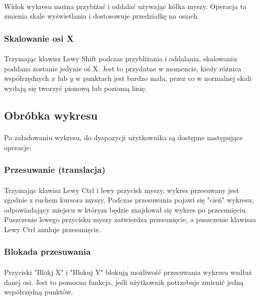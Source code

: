 \documentclass[12pt]{report}
\begin{document}
	\paragraph{}
	Widok wykresu można przybiżać i oddalać używając kółka myszy. Operacja ta zmienia skale wyświetlania i dostosowuje przedziałkę na osiach.
	
	\subsubsection{Skalowanie osi X}
	\paragraph{}
	Trzymając klawisz Lewy Shift podczas przybliżania i oddalania, skalowaniu poddana zostanie jedynie oś X. Jest to przydatne w momencie, kiedy różnica współrzędnych $x$ lub $y$ w punktach jest bardzo mała, przez co w normalnej skali wydają się tworzyć pionową lub poziomą linię.
	
	\subsection{Obróbka wykresu}
	\paragraph{}
	Po załadowaniu wykresu, do dyspozycji użytkownika są dostępne następujące operacje:
	
	\subsubsection{Przesuwanie (translacja)}
	\paragraph{}
	Trzymając klawisz Lewy Ctrl i lewy przycisk myszy, wykres przesuwany jest zgodnie z ruchem kursora myszy. Podczas przesuwania pojawi się "cień" wykresu, odpowiadający miejscu w którym będzie znajdował się wykres po przesunięciu. Puszczenie lewego przycisku myszy zatwierdza przesunięcie, a puszczenie klawisza Lewy Ctrl anuluje przesunięcie.
	
	\subsubsection{Blokada przesuwania}
	\paragraph{}
	Przyciski "Blokj X" i "Blokuj Y" blokują możliwość przesuwania wykresu wzdłuż danej osi. Jest to pomocna funkcja, jeśli użytkownik potrzebuje zmienić jedną współrzędną punktów.
	
\end{document}
